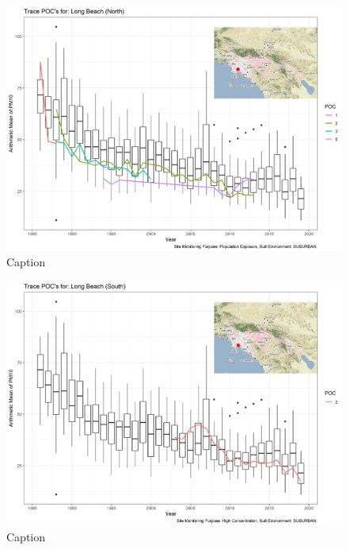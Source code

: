 \begin{figure}
    \centering
    \includegraphics[width = \textwidth]{Figures/IndividualSiteTraces/TracePOC_Long Beach (North).png}
    \caption{Caption}
    \label{fig:my_label}
\end{figure}

\begin{figure}
    \centering
    \includegraphics[width = \textwidth]{Figures/IndividualSiteTraces/TracePOC_Long Beach (South).png}
    \caption{Caption}
    \label{fig:my_label}
\end{figure}

